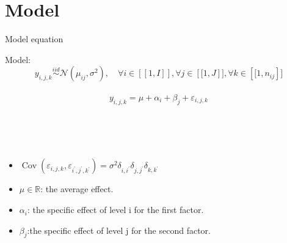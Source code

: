 \documentclass[unknownkeysallowed]{beamer}
\begin{document}
\section{Model}
\begin{frame}{Model equation}
   
  
  
\begin{alertblock}{Model: }
  $$\left.y_{i, j, k} \stackrel{i i d}{\sim} \mathcal{N}\left(\mu_{i j}, \sigma^{2}\right), \quad \forall i \in[\![1, I]\!] , \forall j \in\left[\![1, J\right]\!] ,\forall k \in\left[\![1, n_{i j}\right]\!]$$\\
 
   $$y_{i, j, k}=\mu+\alpha_{i}+\beta_{j}+\varepsilon_{i, j, k}$$
   
\end {alertblock}
  
  \\ \\ \\
  
  
  \begin{itemize}\\ \\

   \item $\operatorname{Cov}\left(\varepsilon_{i, j, k}, \varepsilon_{i^{\prime}, j^{\prime}, k^{\prime}}\right)=\sigma^{2} \delta_{i, i^{\prime}} \delta_{j, j^{\prime}} \delta_{k, k^{\prime}}$\\
   \item$  \mu \in \mathbb{R}$: the average effect.\\
   \item$\alpha_{i}$: the specific effect of level i for the first factor. \\
   \item$\beta_{j}$:the specific effect of level j for the second factor.
   \end{itemize}
\end{frame}
\end{document}
